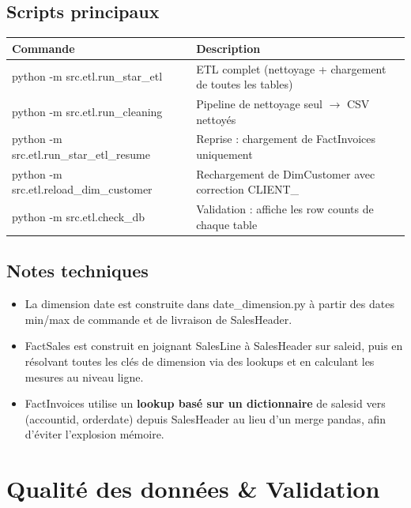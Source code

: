 \documentclass[11pt,a4paper]{article}
\renewcommand{\texttt}[1]{{\ttfamily\small\colorbox{codebg}{\textcolor{darktext}{#1}}}}
\newcommand{\tableheadcolor}{\rowcolor{primary}}
\newcommand{\tableheadfont}{\color{white}\bfseries}
\begin{document}
\subsection{Scripts principaux}

\begin{center}
\small
\begin{tabularx}{\textwidth}{>{\ttfamily\small}p{6.5cm} X}
\toprule
\tableheadcolor
\tableheadfont Commande & \tableheadfont Description \\
\midrule
python -m src.etl.run\_star\_etl & ETL complet (nettoyage + chargement de toutes les tables) \\
\rowcolor{lightbg}
python -m src.etl.run\_cleaning & Pipeline de nettoyage seul $\to$ CSV nettoyés \\
python -m src.etl.run\_star\_etl\_resume & Reprise : chargement de FactInvoices uniquement \\
\rowcolor{lightbg}
python -m src.etl.reload\_dim\_customer & Rechargement de DimCustomer avec correction CLIENT\_ \\
python -m src.etl.check\_db & Validation : affiche les row counts de chaque table \\
\bottomrule
\end{tabularx}
\end{center}

\subsection{Notes techniques}

\begin{itemize}[noitemsep,leftmargin=1.2em]
  \item La dimension date est construite dans \texttt{date\_dimension.py} à partir des dates min/max de commande et de livraison de SalesHeader.
  \item FactSales est construit en joignant SalesLine à SalesHeader sur \texttt{saleid}, puis en résolvant toutes les clés de dimension via des lookups et en calculant les mesures au niveau ligne.
  \item FactInvoices utilise un \textbf{lookup basé sur un dictionnaire} de \texttt{salesid} vers (accountid, orderdate) depuis SalesHeader au lieu d'un merge pandas, afin d'éviter l'explosion mémoire.
\end{itemize}

\section{Qualité des données \& Validation}
\end{document}
